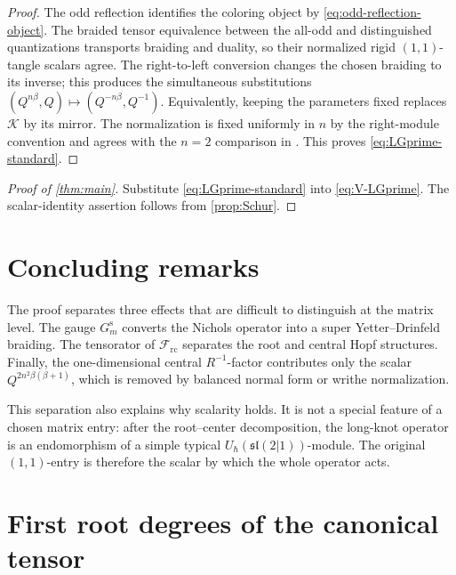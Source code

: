 \documentclass[11pt,a4paper]{article}
\newcommand{\rc}{\mathrm{rc}}
\theoremstyle{definition}
\theoremstyle{remark}
\begin{document}
\begin{proof}
The odd reflection identifies the coloring object by
\eqref{eq:odd-reflection-object}.  The braided tensor equivalence between
the all-odd and distinguished quantizations transports braiding and
duality, so their normalized rigid \((1,1)\)-tangle scalars agree.
The right-to-left conversion changes the chosen braiding to its inverse;
this produces the simultaneous substitutions
\((Q^{n\beta},Q)\mapsto(Q^{-n\beta},Q^{-1})\).
Equivalently, keeping the parameters fixed replaces \(\mathcal K\) by
its mirror.  The normalization is fixed uniformly in \(n\) by the
right-module convention and agrees with the \(n=2\) comparison in
\cite{ColoredLG}.  This proves \eqref{eq:LGprime-standard}.
\end{proof}

\begin{proof}[Proof of \cref{thm:main}]
Substitute \eqref{eq:LGprime-standard} into \eqref{eq:V-LGprime}.
The scalar-identity assertion follows from \cref{prop:Schur}.
\end{proof}

\section{Concluding remarks}

The proof separates three effects that are difficult to distinguish at
the matrix level.  The gauge \(G_m^{\mathrm s}\) converts the Nichols
operator into a super Yetter--Drinfeld braiding.  The tensorator of
\(\mathcal F_{\rc}\) separates the root and central Hopf structures.
Finally, the one-dimensional central \(R^{-1}\)-factor contributes only
the scalar \(Q^{2n^2\beta(\beta+1)}\), which is removed by balanced
normal form or writhe normalization.

This separation also explains why scalarity holds.  It is not a special
feature of a chosen matrix entry: after the root--center decomposition,
the long-knot operator is an endomorphism of a simple typical
\(U_\hbar(\mathfrak{sl}(2|1))\)-module.  The original \((1,1)\)-entry is
therefore the scalar by which the whole operator acts.

\appendix

\section{First root degrees of the canonical tensor}
\end{document}
